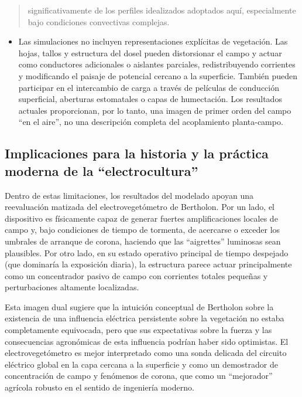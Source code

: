 \documentclass[
]{article}
\providecommand{\tightlist}{%
  \setlength{\itemsep}{0pt}\setlength{\parskip}{0pt}}
\begin{document}
\begin{quote}
significativamente de los perfiles idealizados adoptados aquí,
especialmente bajo condiciones convectivas complejas.
\end{quote}

\begin{itemize}
\tightlist
\item
  Las simulaciones no incluyen representaciones explícitas de
  vegetación. Las hojas, tallos y estructura del dosel pueden
  distorsionar el campo y actuar como conductores adicionales o
  aislantes parciales, redistribuyendo corrientes y modificando el
  paisaje de potencial cercano a la superficie. También pueden
  participar en el intercambio de carga a través de películas de
  conducción superficial, aberturas estomatales o capas de humectación.
  Los resultados actuales proporcionan, por lo tanto, una imagen de
  primer orden del campo ``en el aire'', no una descripción completa del
  acoplamiento planta-campo.
\end{itemize}

\subsection{Implicaciones para la historia y la práctica moderna de la
``electrocultura''}\label{implicaciones-para-la-historia-y-la-pruxe1ctica-moderna-de-la-electrocultura}

Dentro de estas limitaciones, los resultados del modelado apoyan una
reevaluación matizada del electrovegetómetro de Bertholon. Por un lado,
el dispositivo es físicamente capaz de generar fuertes amplificaciones
locales de campo y, bajo condiciones de tiempo de tormenta, de acercarse
o exceder los umbrales de arranque de corona, haciendo que las
``aigrettes'' luminosas sean plausibles. Por otro lado, en su estado
operativo principal de tiempo despejado (que dominaría la exposición
diaria), la estructura parece actuar principalmente como un concentrador
pasivo de campo con corrientes totales pequeñas y perturbaciones
altamente localizadas.

Esta imagen dual sugiere que la intuición conceptual de Bertholon sobre
la existencia de una influencia eléctrica persistente sobre la
vegetación no estaba completamente equivocada, pero que sus expectativas
sobre la fuerza y las consecuencias agronómicas de esta influencia
podrían haber sido optimistas. El electrovegetómetro es mejor
interpretado como una sonda delicada del circuito eléctrico global en la
capa cercana a la superficie y como un demostrador de concentración de
campo y fenómenos de corona, que como un ``mejorador'' agrícola robusto
en el sentido de ingeniería moderno.
\end{document}
